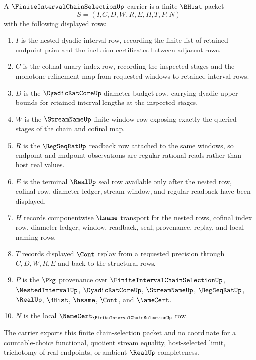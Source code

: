 \begin{definition}
\label{def:finite-interval-chain-selection-carrier}
A $\FiniteIntervalChainSelectionUp$ carrier is a finite $\BHist$ packet
$$
S=(I,C,D,W,R,E,H,T,P,N)
$$
with the following displayed rows:
\begin{enumerate}
\item $I$ is the nested dyadic interval row, recording the finite list of retained endpoint pairs and the inclusion certificates between adjacent rows.
\item $C$ is the cofinal unary index row, recording the inspected stages and the monotone refinement map from requested windows to retained interval rows.
\item $D$ is the $\DyadicRatCoreUp$ diameter-budget row, carrying dyadic upper bounds for retained interval lengths at the inspected stages.
\item $W$ is the $\StreamNameUp$ finite-window row exposing exactly the queried stages of the chain and cofinal map.
\item $R$ is the $\RegSeqRatUp$ readback row attached to the same windows, so endpoint and midpoint observations are regular rational reads rather than host real values.
\item $E$ is the terminal $\RealUp$ seal row available only after the nested row, cofinal row, diameter ledger, stream window, and regular readback have been displayed.
\item $H$ records componentwise $\hsame$ transport for the nested rows, cofinal index row, diameter ledger, window, readback, seal, provenance, replay, and local naming rows.
\item $T$ records displayed $\Cont$ replay from a requested precision through $C,D,W,R,E$ and back to the structural rows.
\item $P$ is the $\Pkg$ provenance over $\FiniteIntervalChainSelectionUp$, $\NestedIntervalUp$, $\DyadicRatCoreUp$, $\StreamNameUp$, $\RegSeqRatUp$, $\RealUp$, $\BHist$, $\hsame$, $\Cont$, and $\NameCert$.
\item $N$ is the local $\NameCert_{\FiniteIntervalChainSelectionUp}$ row.
\end{enumerate}
The carrier exports this finite chain-selection packet and no coordinate for a countable-choice functional, quotient stream equality, host-selected limit, trichotomy of real endpoints, or ambient $\RealUp$ completeness.
\end{definition}

